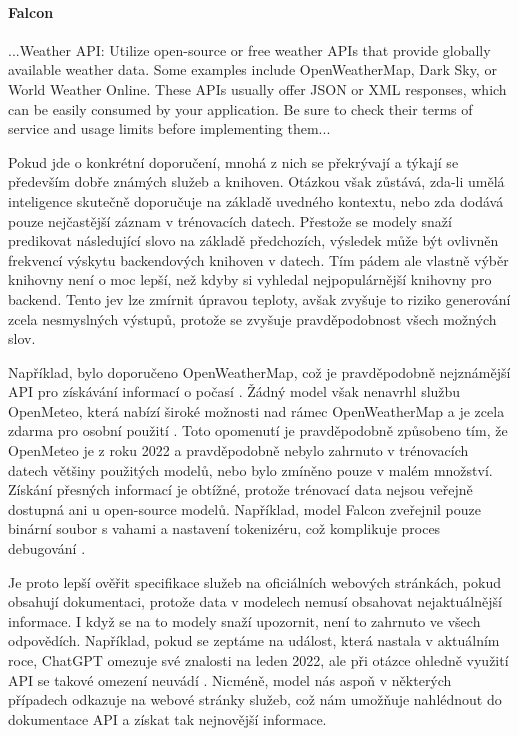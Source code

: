\documentclass[FM,DP]{tulthesis}
\begin{document}
		\vspace{0.6em}
		\begin{tcolorbox}[colback=white,colframe=black]
			\paragraph{Falcon}
			...Weather API: Utilize open-source or free weather APIs that provide globally available weather data. Some examples include OpenWeatherMap, Dark Sky, or World Weather Online. These APIs usually offer JSON or XML responses, which can be easily consumed by your application. Be sure to check their terms of service and usage limits before implementing them... \cite{falcon_analyza}
		\end{tcolorbox}
		\vspace{0.6em}
		
		Pokud jde o konkrétní doporučení, mnohá z nich se překrývají a týkají se především dobře známých služeb a knihoven. Otázkou však zůstává, zda-li umělá inteligence skutečně doporučuje na základě uvedného kontextu, nebo zda dodává pouze nejčastější záznam v trénovacích datech. Přestože se modely snaží predikovat následující slovo na základě předchozích, výsledek může být ovlivněn frekvencí výskytu backendových knihoven v datech. Tím pádem ale vlastně výběr knihovny není o moc lepší, než kdyby si vyhledal nejpopulárnější knihovny pro backend. Tento jev lze zmírnit úpravou teploty, avšak zvyšuje to riziko generování zcela nesmyslných výstupů, protože se zvyšuje pravděpodobnost všech možných slov.
		
		Například, bylo doporučeno OpenWeatherMap, což je pravděpodobně nejznámější API pro získávání informací o počasí \cite{bard_analyza} \cite{bingCopilot_analyza} \cite{webapp_basics} \cite{openweather}. Žádný model však nenavrhl službu OpenMeteo, která nabízí široké možnosti nad rámec OpenWeatherMap a je zcela zdarma pro osobní použití \cite{openmeteo}. Toto opomenutí je pravděpodobně způsobeno tím, že OpenMeteo je z roku 2022 a pravděpodobně nebylo zahrnuto v trénovacích datech většiny použitých modelů, nebo bylo zmíněno pouze v malém množství. Získání přesných informací je obtížné, protože trénovací data nejsou veřejně dostupná ani u open-source modelů. Například, model Falcon zveřejnil pouze binární soubor s vahami a nastavení tokenizéru, což komplikuje proces debugování \cite{falcon}.
		
		Je proto lepší ověřit specifikace služeb na oficiálních webových stránkách, pokud obsahují dokumentaci, protože data v modelech nemusí obsahovat nejaktuálnější informace. I když se na to modely snaží upozornit, není to zahrnuto ve všech odpovědích. Například, pokud se zeptáme na událost, která nastala v aktuálním roce, ChatGPT omezuje své znalosti na leden 2022, ale při otázce ohledně využití API se takové omezení neuvádí \cite{chatgpt_knowledge}. Nicméně, model nás aspoň v některých případech odkazuje na webové stránky služeb, což nám umožňuje nahlédnout do dokumentace API a získat tak nejnovější informace.
		
\end{document}
